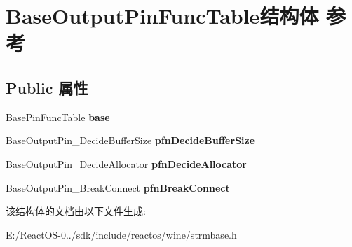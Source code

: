 \hypertarget{struct_base_output_pin_func_table}{}\section{Base\+Output\+Pin\+Func\+Table结构体 参考}
\label{struct_base_output_pin_func_table}
\subsection*{Public 属性}
\begin{DoxyCompactItemize}
\item 
\mbox{\label{struct_base_output_pin_func_table_a7aef7638248c986fd90f6a876659436c}} 
\hyperlink{struct_base_pin_func_table}{Base\+Pin\+Func\+Table} {\bfseries base}
\item 
\mbox{\label{struct_base_output_pin_func_table_a8e33a3840043d8b12366fe85de938025}} 
Base\+Output\+Pin\+\_\+\+Decide\+Buffer\+Size {\bfseries pfn\+Decide\+Buffer\+Size}
\item 
\mbox{\label{struct_base_output_pin_func_table_a3995cc36f2b382b3dba5e65d264d71f8}} 
Base\+Output\+Pin\+\_\+\+Decide\+Allocator {\bfseries pfn\+Decide\+Allocator}
\item 
\mbox{\label{struct_base_output_pin_func_table_adb7eec4732125b63965c8f11a4944ea0}} 
Base\+Output\+Pin\+\_\+\+Break\+Connect {\bfseries pfn\+Break\+Connect}
\end{DoxyCompactItemize}


该结构体的文档由以下文件生成\+:\begin{DoxyCompactItemize}
\item 
E\+:/\+React\+O\+S-\/0../sdk/include/reactos/wine/strmbase.\+h\end{DoxyCompactItemize}
